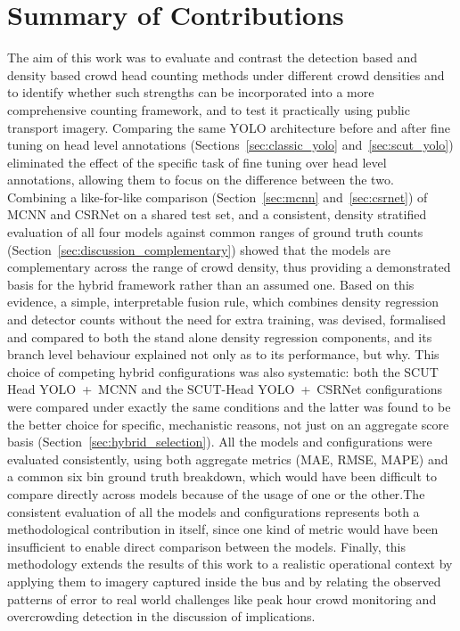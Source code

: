 \label{chap:conclusion}

\section{Summary of Contributions}
\label{sec:conclusion_contributions}
The aim of this work was to evaluate and contrast the detection based and density based crowd head counting methods under different crowd densities and to identify whether such strengths can be incorporated into a more comprehensive counting framework, and to test it practically using public transport imagery. Comparing the same YOLO architecture before and after fine tuning on head level annotations (Sections~\ref{sec:classic_yolo} and~\ref{sec:scut_yolo}) eliminated the effect of the specific task of fine tuning over head level annotations, allowing them to focus on the difference between the two. Combining a like-for-like comparison (Section~\ref{sec:mcnn} and~\ref{sec:csrnet}) of MCNN and CSRNet on a shared test set, and a consistent, density stratified evaluation of all four models against common ranges of ground truth counts (Section~\ref{sec:discussion_complementary}) showed that the models are complementary across the range of crowd density, thus providing a demonstrated basis for the hybrid framework rather than an assumed one. Based on this evidence, a simple, interpretable fusion rule, which combines density regression and detector counts without the need for extra training, was devised, formalised and compared to both the stand alone density regression components, and its branch level behaviour explained not only as to its performance, but why. This choice of competing hybrid configurations was also systematic: both the SCUT Head YOLO~+~MCNN and the SCUT-Head YOLO~+~CSRNet configurations were compared under exactly the same conditions and the latter was found to be the better choice for specific, mechanistic reasons, not just on an aggregate score basis (Section~\ref{sec:hybrid_selection}). All the models and configurations were evaluated consistently, using both aggregate metrics (MAE, RMSE, MAPE) and a common six bin ground truth breakdown, which would have been difficult to compare directly across models because of the usage of one or the other.The consistent evaluation of all the models and configurations represents both a methodological contribution in itself, since one kind of metric would have been insufficient to enable direct comparison between the models. Finally, this methodology extends the results of this work to a realistic operational context by applying them to imagery captured inside the bus and by relating the observed patterns of error to real world challenges like peak hour crowd monitoring and overcrowding detection in the discussion of implications.

